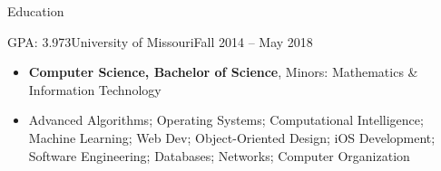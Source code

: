 \documentclass[]{mcdowellcv}
\begin{document}
    \makeheader

    \begin{cvsection}{Education}
        \begin{cvsubsection}{GPA: 3.973}{University of Missouri}{Fall 2014 -- May 2018}
            \begin{itemize}
                \item \textbf{Computer Science, Bachelor of Science}, Minors: Mathematics \& Information Technology
                \item Advanced Algorithms; Operating Systems; Computational Intelligence; Machine Learning; Web Dev; Object-Oriented Design;
                        iOS Development; Software Engineering; Databases; Networks; Computer Organization
            \end{itemize}
        \end{cvsubsection}
    \end{cvsection}
    
\end{document}

